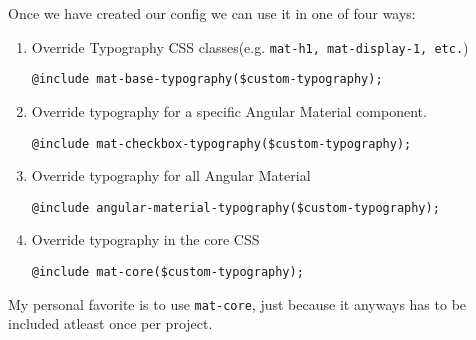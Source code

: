 Once we have created our config we can use it in one of four ways: 
\begin{enumerate}
\item Override Typography CSS classes(e.g. \lstinline{mat-h1, mat-display-1, etc.})
\begin{verbatim}
@include mat-base-typography($custom-typography);
\end{verbatim}

\item Override typography for a specific Angular Material component.
\begin{verbatim}
@include mat-checkbox-typography($custom-typography);
\end{verbatim}

\item Override typography for all Angular Material
\begin{verbatim}
@include angular-material-typography($custom-typography);
\end{verbatim}

\item Override typography in the core CSS
\begin{verbatim}
@include mat-core($custom-typography);
\end{verbatim}
\end{enumerate}

My personal favorite is to use \lstinline{mat-core}, just because it anyways  
has to be included atleast once per project. 



